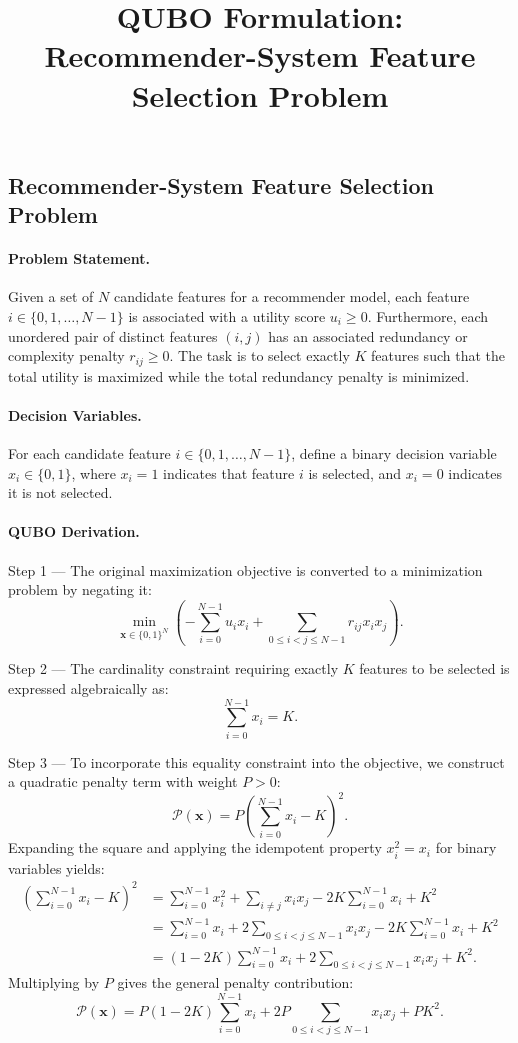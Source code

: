 \documentclass[12pt]{article}
\title{QUBO Formulation: Recommender-System Feature Selection Problem}
\date{}
\begin{document}
\maketitle

\subsection*{Recommender-System Feature Selection Problem}

\paragraph{Problem Statement.}
Given a set of $N$ candidate features for a recommender model, each feature $i \in \{0, 1, \dots, N-1\}$ is associated with a utility score $u_i \geq 0$. Furthermore, each unordered pair of distinct features $(i,j)$ has an associated redundancy or complexity penalty $r_{ij} \geq 0$. The task is to select exactly $K$ features such that the total utility is maximized while the total redundancy penalty is minimized.

\paragraph{Decision Variables.}
For each candidate feature $i \in \{0, 1, \dots, N-1\}$, define a binary decision variable $x_i \in \{0, 1\}$, where $x_i = 1$ indicates that feature $i$ is selected, and $x_i = 0$ indicates it is not selected.

\paragraph{QUBO Derivation.}
Step 1 --- The original maximization objective is converted to a minimization problem by negating it:
\[
\min_{\mathbf{x} \in \{0,1\}^N} \left( -\sum_{i=0}^{N-1} u_i x_i + \sum_{0 \leq i < j \leq N-1} r_{ij} x_i x_j \right).
\]

Step 2 --- The cardinality constraint requiring exactly $K$ features to be selected is expressed algebraically as:
\[
\sum_{i=0}^{N-1} x_i = K.
\]

Step 3 --- To incorporate this equality constraint into the objective, we construct a quadratic penalty term with weight $P > 0$:
\[
\mathcal{P}(\mathbf{x}) = P \left( \sum_{i=0}^{N-1} x_i - K \right)^2.
\]
Expanding the square and applying the idempotent property $x_i^2 = x_i$ for binary variables yields:
\begin{align}
\left( \sum_{i=0}^{N-1} x_i - K \right)^2 &= \sum_{i=0}^{N-1} x_i^2 + \sum_{i \neq j} x_i x_j - 2K \sum_{i=0}^{N-1} x_i + K^2 \\
&= \sum_{i=0}^{N-1} x_i + 2\sum_{0 \leq i < j \leq N-1} x_i x_j - 2K \sum_{i=0}^{N-1} x_i + K^2 \\
&= (1 - 2K) \sum_{i=0}^{N-1} x_i + 2 \sum_{0 \leq i < j \leq N-1} x_i x_j + K^2.
\end{align}
Multiplying by $P$ gives the general penalty contribution:
\[
\mathcal{P}(\mathbf{x}) = P(1 - 2K) \sum_{i=0}^{N-1} x_i + 2P \sum_{0 \leq i < j \leq N-1} x_i x_j + P K^2.
\]
\end{document}
